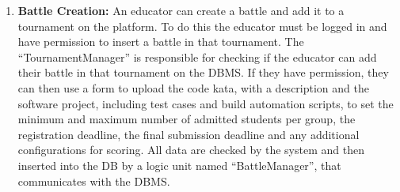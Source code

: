 \begin{enumerate}
   \item \textbf{Battle Creation:}
    An educator can create a battle and add it to a tournament on the platform. To do this the educator must be logged in and have permission to insert a battle in that tournament.  
    The “TournamentManager” is responsible for checking if the educator can add their battle in that tournament on the DBMS. If they have permission, they can then use a form to upload the code kata, with a description and the software project, including test cases and build automation scripts, to set the minimum and maximum number of admitted students per group, the registration deadline, the final submission deadline and any additional configurations for scoring. All data are checked by the system and then inserted into the DB by a logic unit named “BattleManager”, that communicates with the DBMS.
    

\end{enumerate}
